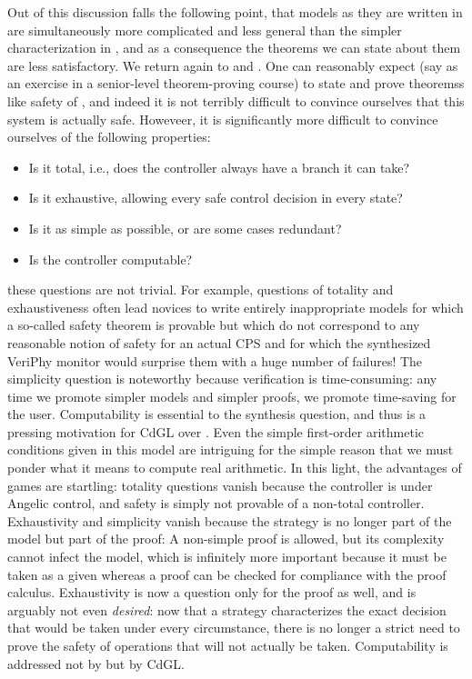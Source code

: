 \documentclass[12pt]{cmuthesis}
\theoremstyle{definition}
\theoremstyle{remark}
\newcommand{\rref}[2][]{\prettyref{#2}}
\newcommand{\CdGL}{\textsf{CdGL}\xspace}
\newcommand{\VeriPhy}{VeriPhy\xspace}
\begin{document}
Out of this discussion falls the following point, that models as they are written in \dL are simultaneously more complicated and less general than the simpler characterization in \dGL, and as a consequence the theorems we can state about them are less satisfactory.
We return again to \rref{ex:driving-game} and \rref{ex:driving-system}.
One can reasonably expect (say as an exercise in a senior-level theorem-proving course) to state and prove theoremss like safety of \rref{ex:driving-system}, and indeed it is not terribly difficult to convince ourselves that this system is actually safe.
Howeveer, it is significantly more difficult to convince ourselves of the following properties:
\begin{itemize}
\item Is it total, i.e., does the controller always have a branch it can take?
\item Is it exhaustive, allowing every safe control decision in every state?
\item Is it as simple as possible, or are some cases redundant?
\item Is the controller computable?
\end{itemize}
these questions are not trivial.
For example, questions of totality and exhaustiveness often lead novices to write entirely inappropriate models for which a so-called safety theorem is provable but which do not correspond to any reasonable notion of safety for an actual CPS and for which the synthesized \VeriPhy monitor would surprise them with a huge number of failures!
The simplicity question is noteworthy because verification is time-consuming: any time we promote simpler models and simpler proofs, we promote time-saving for the user.
Computability is essential to the synthesis question, and thus is a pressing motivation for \CdGL over \dGL.
Even the simple first-order arithmetic conditions given in this model are intriguing for the simple reason that we must ponder what it means to compute real arithmetic.
In this light, the advantages of games are startling: totality questions vanish because the controller is under Angelic control, and safety is simply not provable of a non-total controller.
Exhaustivity and simplicity vanish because the strategy is no longer part of the model but part of the proof: A non-simple proof is allowed, but its complexity cannot infect the model, which is infinitely more important because it must be taken as a given whereas a proof can be checked for compliance with the proof calculus.
Exhaustivity is now a question only for the proof as well, and is arguably not even \emph{desired}: now that a strategy characterizes the exact decision that would be taken under every circumstance, there is no longer a strict need to prove the safety of operations that will not actually be taken.
Computability is addressed not by \dGL but by \CdGL.
\end{document}
